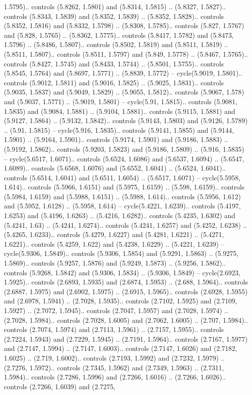 1.5795).. controls (5.8262, 1.5801) and (5.8314, 1.5815) .. (5.8327, 1.5827).. controls (5.8343, 1.5839) and (5.8352, 1.5839) .. (5.8352, 1.5828).. controls (5.8352, 1.5816) and (5.8332, 1.5798) .. (5.8308, 1.5785).. controls (5.827, 1.5767) and (5.828, 1.5765) .. (5.8362, 1.5775).. controls (5.8417, 1.5782) and (5.8473, 1.5796) .. (5.8486, 1.5807).. controls (5.8502, 1.5819) and (5.8511, 1.5819) .. (5.8511, 1.5807).. controls (5.8511, 1.5797) and (5.849, 1.5778) .. (5.8467, 1.5765).. controls (5.8427, 1.5745) and (5.8433, 1.5744) .. (5.8501, 1.5755).. controls (5.8545, 1.5764) and (5.8697, 1.5771) .. (5.8839, 1.5772) -- cycle(5.9019, 1.5801).. controls (5.9012, 1.5811) and (5.9016, 1.5825) .. (5.9025, 1.5831).. controls (5.9035, 1.5837) and (5.9049, 1.5829) .. (5.9055, 1.5812).. controls (5.9067, 1.578) and (5.9037, 1.5771) .. (5.9019, 1.5801) -- cycle(5.91, 1.5815).. controls (5.9081, 1.5835) and (5.9084, 1.5881) .. (5.9104, 1.5881).. controls (5.9115, 1.5881) and (5.9127, 1.5864) .. (5.9132, 1.5842).. controls (5.9143, 1.5803) and (5.9126, 1.5789) .. (5.91, 1.5815) -- cycle(5.916, 1.5835).. controls (5.9141, 1.5855) and (5.9144, 1.5901) .. (5.9164, 1.5901).. controls (5.9174, 1.5901) and (5.9186, 1.5883) .. (5.9192, 1.5862).. controls (5.9203, 1.5823) and (5.9186, 1.5809) .. (5.916, 1.5835) -- cycle(5.6517, 1.6071).. controls (5.6524, 1.6086) and (5.6537, 1.6094) .. (5.6547, 1.6089).. controls (5.6568, 1.6076) and (5.6552, 1.6041) .. (5.6524, 1.6041).. controls (5.6514, 1.6041) and (5.6511, 1.6054) .. (5.6517, 1.6071) -- cycle(5.5958, 1.614).. controls (5.5966, 1.6151) and (5.5975, 1.6159) .. (5.598, 1.6159).. controls (5.5984, 1.6159) and (5.5988, 1.6151) .. (5.5988, 1.614).. controls (5.5956, 1.612) and (5.5952, 1.6128) .. (5.5958, 1.614) -- cycle(5.4221, 1.6239).. controls (5.4197, 1.6253) and (5.4196, 1.6263) .. (5.4216, 1.6282).. controls (5.4235, 1.6302) and (5.4241, 1.63) .. (5.4241, 1.6274).. controls (5.4241, 1.6257) and (5.4252, 1.6238) .. (5.4265, 1.6233).. controls (5.4279, 1.6227) and (5.4281, 1.6221) .. (5.4271, 1.6221).. controls (5.4259, 1.622) and (5.4238, 1.6229) .. (5.4221, 1.6239) -- cycle(5.9306, 1.5849).. controls (5.9306, 1.5854) and (5.9291, 1.5863) .. (5.9275, 1.5869).. controls (5.9257, 1.5876) and (5.9249, 1.5873) .. (5.9256, 1.5862).. controls (5.9268, 1.5842) and (5.9306, 1.5834) .. (5.9306, 1.5849) -- cycle(2.6923, 1.5925).. controls (2.6893, 1.5935) and (2.6874, 1.5953) .. (2.688, 1.5964).. controls (2.6887, 1.5975) and (2.6902, 1.5975) .. (2.6915, 1.5965).. controls (2.6928, 1.5955) and (2.6978, 1.5941) .. (2.7028, 1.5935).. controls (2.7102, 1.5925) and (2.7109, 1.5927) .. (2.7072, 1.5945).. controls (2.7047, 1.5957) and (2.7028, 1.5974) .. (2.7028, 1.5984).. controls (2.7028, 1.6005) and (2.7062, 1.6005) .. (2.707, 1.5984).. controls (2.7074, 1.5974) and (2.7113, 1.5961) .. (2.7157, 1.5955).. controls (2.7224, 1.5943) and (2.7229, 1.5945) .. (2.7191, 1.5964).. controls (2.7167, 1.5977) and (2.7147, 1.5994) .. (2.7147, 1.6003).. controls (2.7147, 1.6026) and (2.7182, 1.6025) .. (2.719, 1.6002).. controls (2.7193, 1.5992) and (2.7232, 1.5979) .. (2.7276, 1.5972).. controls (2.7345, 1.5962) and (2.7349, 1.5963) .. (2.7311, 1.5984).. controls (2.7286, 1.5996) and (2.7266, 1.6016) .. (2.7266, 1.6026).. controls (2.7266, 1.6039) and (2.7275, 